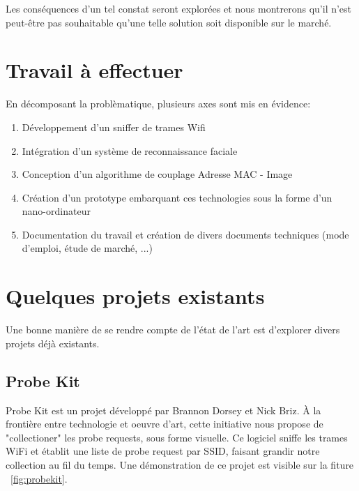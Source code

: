 Les conséquences d'un tel constat seront explorées et nous montrerons qu'il n'est peut-être pas souhaitable qu'une telle solution soit disponible sur le marché.  

\section{Travail à effectuer}

En décomposant la problèmatique, plusieurs axes sont mis en évidence:
\begin{enumerate}
\item Développement d'un sniffer de trames Wifi
\item Intégration d'un système de reconnaissance faciale
\item Conception d'un algorithme de couplage Adresse MAC - Image
\item Création d'un prototype embarquant ces technologies sous la forme d'un nano-ordinateur
\item Documentation du travail et création de divers documents techniques (mode d'emploi, étude de marché, ...)
\end{enumerate}

\section{Quelques projets existants}
Une bonne manière de se rendre compte de l'état de l'art est d'explorer divers projets déjà existants.

\subsection{Probe Kit}

Probe Kit est un projet développé par Brannon Dorsey et Nick Briz. À la frontière entre technologie et oeuvre d'art, cette initiative nous propose de "collectioner" les
probe requests, sous forme visuelle. 
Ce logiciel sniffe les trames WiFi et établit une liste de probe request par SSID, faisant grandir notre collection au fil du temps.
Une démonstration de ce projet est visible sur la fiture ~\ref{fig:probekit}.

